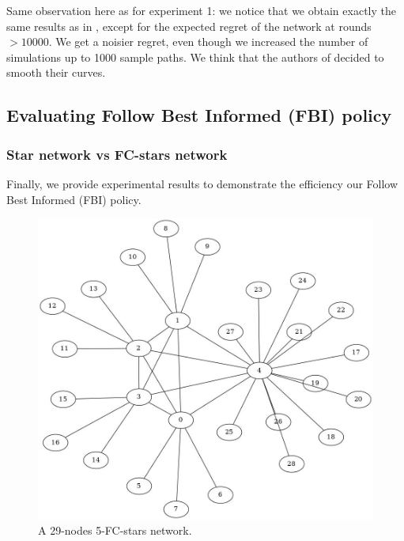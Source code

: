 \documentclass{article}
\begin{document}
Same observation here as for experiment 1: we notice that we obtain exactly the same results as in \cite{DBLP:journals/corr/KollaJG16}, except for the expected regret of the network at rounds $ > 10000$. We get a noisier regret, even though we increased the number of simulations up to 1000 sample paths. We think that the authors of \cite{DBLP:journals/corr/KollaJG16} decided to smooth their curves.

\subsection{Evaluating Follow Best Informed (FBI) policy}

\subsubsection{Star network vs FC-stars network}

Finally, we provide experimental results to demonstrate the efficiency our Follow Best Informed (FBI) policy.

\begin{figure}[H]
  \centering
  \includegraphics[width=0.6\linewidth]{fcstars.jpg}
  \caption{A 29-nodes 5-FC-stars network.}
\end{figure}
\end{document}

